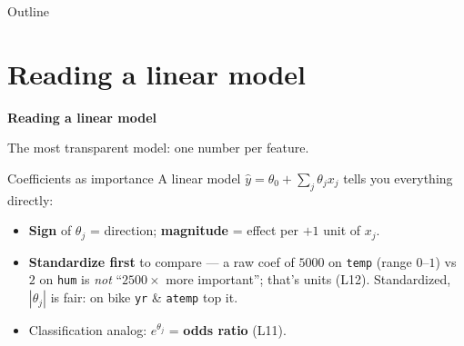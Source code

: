 \documentclass[aspectratio=169]{beamer}
\begin{document}
\begin{frame}{Outline}
  \tableofcontents
\end{frame}

\section{Reading a linear model}

\begin{frame}[plain]
  \vfill
  \begin{center}
    {\Large\color{popblue}\textbf{Reading a linear model}}\\[0.9em]
    \begin{minipage}{0.82\textwidth}\centering\small
      The most transparent model: one number per feature.
    \end{minipage}
  \end{center}
  \vfill
\end{frame}

\begin{frame}{Coefficients as importance}
  A linear model $\hat y = \theta_0 + \sum_j \theta_j x_j$ tells you everything directly:
  \begin{itemize}\small
    \item \textbf{Sign} of $\theta_j$ = direction; \textbf{magnitude} = effect per $+1$ unit of $x_j$.
    \item \textbf{Standardize first} to compare --- a raw coef of $5000$ on \texttt{temp} (range
      $0$--$1$) vs $2$ on \texttt{hum} is \emph{not} ``$2500\times$ more important''; that's units
      (L12). Standardized, $|\theta_j|$ is fair: on bike \texttt{yr} \& \texttt{atemp} top it.
    \item Classification analog: $e^{\theta_j}$ = \textbf{odds ratio} (L11).
  \end{itemize}
  \vfill
\end{frame}
\end{document}

